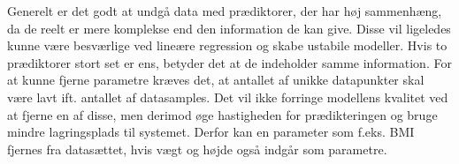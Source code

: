 Generelt er det godt at undgå data med prædiktorer, der har høj sammenhæng, da de reelt er mere komplekse end den information de kan give. Disse vil ligeledes kunne være besværlige ved lineære regression og skabe ustabile modeller. Hvis to prædiktorer stort set er ens, betyder det at de indeholder samme information. For at kunne fjerne parametre kræves det, at antallet af unikke datapunkter skal være lavt ift. antallet af datasamples. Det vil ikke forringe modellens kvalitet ved at fjerne en af disse, men derimod øge hastigheden for prædikteringen og bruge mindre lagringsplads til systemet. Derfor kan en parameter som f.eks. BMI fjernes fra datasættet, hvis vægt og højde også indgår som parametre.\cite{Kuhn2013}


